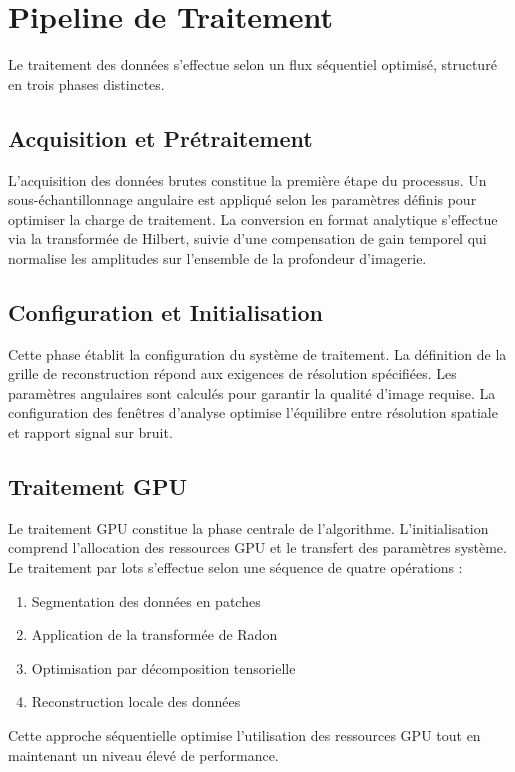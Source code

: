 \documentclass[12pt,a4paper]{article}
\begin{document}
\section{Pipeline de Traitement}

Le traitement des données s'effectue selon un flux séquentiel optimisé, structuré en trois phases distinctes.

\subsection{Acquisition et Prétraitement}
L'acquisition des données brutes constitue la première étape du processus. Un sous-échantillonnage angulaire est appliqué selon les paramètres définis pour optimiser la charge de traitement. La conversion en format analytique s'effectue via la transformée de Hilbert, suivie d'une compensation de gain temporel qui normalise les amplitudes sur l'ensemble de la profondeur d'imagerie.

\subsection{Configuration et Initialisation}
Cette phase établit la configuration du système de traitement. La définition de la grille de reconstruction répond aux exigences de résolution spécifiées. Les paramètres angulaires sont calculés pour garantir la qualité d'image requise. La configuration des fenêtres d'analyse optimise l'équilibre entre résolution spatiale et rapport signal sur bruit.

\subsection{Traitement GPU}
Le traitement GPU constitue la phase centrale de l'algorithme. L'initialisation comprend l'allocation des ressources GPU et le transfert des paramètres système. Le traitement par lots s'effectue selon une séquence de quatre opérations :
\begin{enumerate}
    \item Segmentation des données en patches
    \item Application de la transformée de Radon
    \item Optimisation par décomposition tensorielle
    \item Reconstruction locale des données
\end{enumerate}

Cette approche séquentielle optimise l'utilisation des ressources GPU tout en maintenant un niveau élevé de performance.
\end{document}
